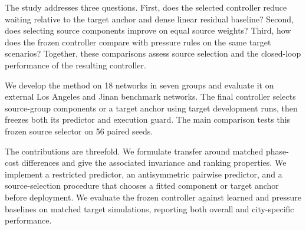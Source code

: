 The study addresses three questions. First, does the selected controller reduce waiting relative to the target anchor and dense linear residual baseline? Second, does selecting source components improve on equal source weights? Third, how does the frozen controller compare with pressure rules on the same target scenarios? Together, these comparisons assess source selection and the closed-loop performance of the resulting controller.

We develop the method on 18 networks in seven groups and evaluate it on external Los Angeles and Jinan benchmark networks. The final controller selects source-group components or a target anchor using target development runs, then freezes both its predictor and execution guard. The main comparison tests this frozen source selector on 56 paired seeds.

The contributions are threefold. We formulate transfer around matched phase-cost differences and give the associated invariance and ranking properties. We implement a restricted predictor, an antisymmetric pairwise predictor, and a source-selection procedure that chooses a fitted component or target anchor before deployment. We evaluate the frozen controller against learned and pressure baselines on matched target simulations, reporting both overall and city-specific performance.
